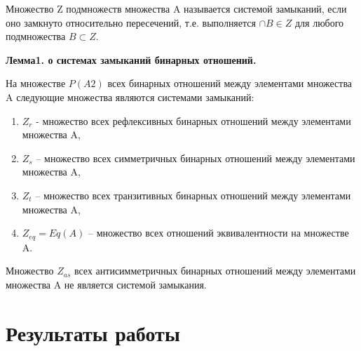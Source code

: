 \documentclass[spec, och, labwork]{shiza}
\begin{document}
Множество Z подмножеств множества A называется системой замыканий, если оно замкнуто относительно пересечений, т.е. 
выполняется $\cap B \in Z$ для любого подмножества $B \subset Z$.

\textbf{Лемма1. о системах замыканий бинарных отношений.} 

На множестве $P(A2)$ всех бинарных отношений между элементами множества A следующие множества являются системами замыканий:

\begin{enumerate}
    \item $Z_r$ - множество всех рефлексивных бинарных отношений между элементами множества A,
    \item $Z_s$ – множество всех симметричных бинарных отношений между элементами множества A,
    \item $Z_t$ – множество всех транзитивных бинарных отношений между элементами множества A,
    \item $Z_{eq} = Eq(A)$ – множество всех отношений эквивалентности на множестве A.
    
\end{enumerate}

Множество $Z_{as}$ всех антисимметричных бинарных отношений между элементами множества A не является системой замыкания.

\section{Результаты работы}
\end{document}
